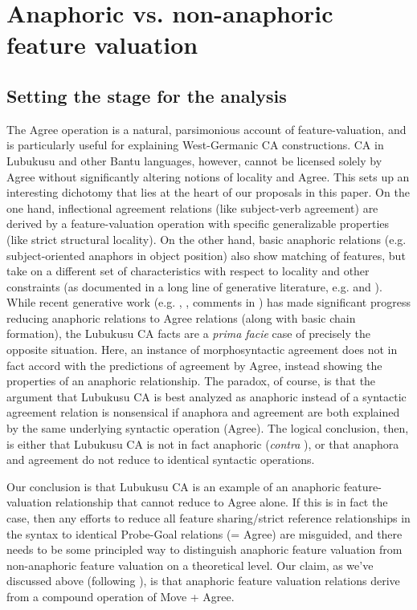 \documentclass[output=paper
,modfonts
,nonflat
]{langsci/langscibook}
\begin{document}
\section{Anaphoric vs. non-anaphoric feature valuation} \label{AnalysisSection}

\subsection{Setting the stage for the analysis}

The Agree operation is a natural, parsimonious account of feature-valuation, and is particularly useful for explaining West-Germanic CA constructions. CA in Lubukusu and other Bantu languages, however, cannot be licensed solely by Agree without significantly altering notions of locality and Agree.  
This sets up an interesting dichotomy that lies at the heart of our proposals in this paper. On the one hand, inflectional agreement relations (like subject-verb agreement) are derived by a feature-valuation operation with specific generalizable properties (like strict structural locality). On the other hand, basic anaphoric relations (e.g. subject-oriented anaphors in object position) also show matching of features, but take on a different set of characteristics with respect to locality and other constraints (as documented in a long line of generative literature, e.g. \citealt{Chomsky:1981,Safir:2004,Reuland:2011} and ). While recent generative work (e.g. \citealt{Reuland:2011}, \citealt{Hicks:2009}, comments in \citealt{Wurmbrand:2011}) has made significant progress reducing anaphoric relations to Agree relations (along with basic chain formation), the Lubukusu CA facts are a \textit{prima facie} case of precisely the opposite situation. Here, an instance of morphosyntactic agreement does not in fact accord with the predictions of agreement by Agree, instead showing the properties of an anaphoric relationship. The paradox, of course, is that the argument that Lubukusu CA is best analyzed as anaphoric instead of a syntactic agreement relation is nonsensical if anaphora and agreement are both explained by the same underlying syntactic operation (Agree). The logical conclusion, then, is either that Lubukusu CA is not in fact anaphoric (\textit{contra} \citealt{Diercks:2013}), or that anaphora and agreement do not reduce to identical syntactic operations.

Our conclusion is that Lubukusu CA is an example of an anaphoric feature-valuation relationship that cannot reduce to Agree alone. If this is in fact the case, then any efforts to reduce all feature sharing/strict reference relationships in the syntax to identical Probe-Goal relations (= Agree) are misguided, and there needs to be some principled way to distinguish anaphoric feature valuation from non-anaphoric feature valuation on a theoretical level. Our claim, as we’ve discussed above (following \citealt{Rooryck:2011}), is that anaphoric feature valuation relations derive from a compound operation of Move + Agree.
\end{document}
